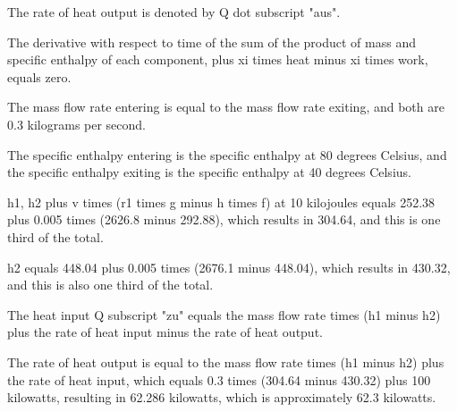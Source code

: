 The rate of heat output is denoted by Q dot subscript "aus".

The derivative with respect to time of the sum of the product of mass and specific enthalpy of each component, plus xi times heat minus xi times work, equals zero.

The mass flow rate entering is equal to the mass flow rate exiting, and both are 0.3 kilograms per second.

The specific enthalpy entering is the specific enthalpy at 80 degrees Celsius, and the specific enthalpy exiting is the specific enthalpy at 40 degrees Celsius.

h1, h2 plus v times (r1 times g minus h times f) at 10 kilojoules equals 252.38 plus 0.005 times (2626.8 minus 292.88), which results in 304.64, and this is one third of the total.

h2 equals 448.04 plus 0.005 times (2676.1 minus 448.04), which results in 430.32, and this is also one third of the total.

The heat input Q subscript "zu" equals the mass flow rate times (h1 minus h2) plus the rate of heat input minus the rate of heat output.

The rate of heat output is equal to the mass flow rate times (h1 minus h2) plus the rate of heat input, which equals 0.3 times (304.64 minus 430.32) plus 100 kilowatts, resulting in 62.286 kilowatts, which is approximately 62.3 kilowatts.